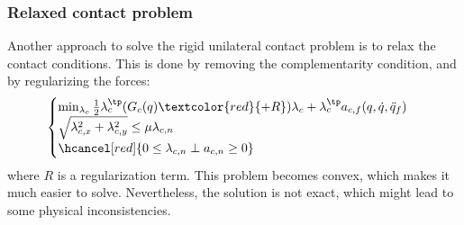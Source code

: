 \subsubsection{Relaxed contact problem}
Another approach to solve the rigid unilateral contact problem is to relax the contact conditions. This is done by removing the complementarity condition, and by regularizing the forces:
\begin{equation*}
    \begin{cases}
        \min_{\lambda_c} \frac{1}{2}\lambda_c^\tp (G_c(q)\textcolor{red}{+R})\lambda_c + \lambda_c^\tp a_{c, f}(q, \dot{q}, \ddot{q}_f) \\
        \sqrt{\lambda_{c,x}^2 + \lambda_{c,y}^2} \leq \mu\lambda_{c,n}\\
        \hcancel[red]{0\leq\lambda_{c,n} \perp a_{c,n}\geq 0}
    \end{cases}
\end{equation*}
where $R$ is a regularization term. This problem becomes convex, which makes it much easier to solve. Nevertheless, the solution is not exact, which might lead to some physical inconsistencies.